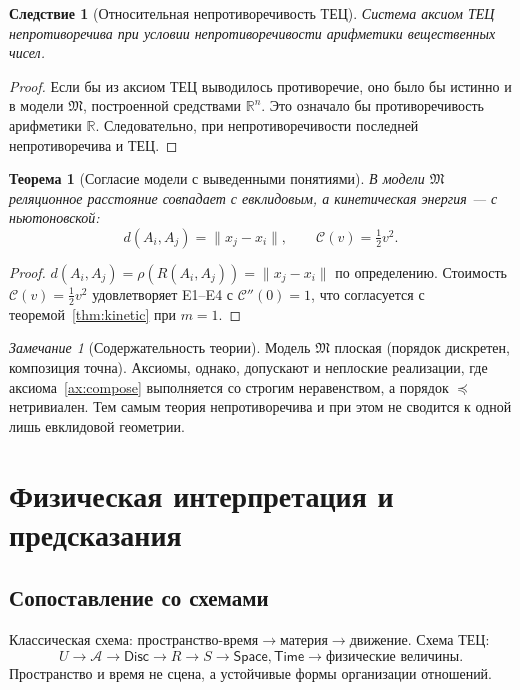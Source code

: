 \documentclass[12pt,a4paper,oneside]{book}
\theoremstyle{definition}
\theoremstyle{plain}
\newtheorem{theorem}{Теорема}[chapter]
\newtheorem{corollary}{Следствие}[chapter]
\theoremstyle{remark}
\newtheorem{remark}{Замечание}[chapter]
\newcommand{\Whole}{U}
\newcommand{\Parts}{\mathcal A}
\newcommand{\Rel}{R}
\newcommand{\State}{S}
\newcommand{\Vord}{\preceq}
\newcommand{\norm}{\rho}
\newcommand{\Disc}{\mathsf{Disc}}
\newcommand{\Space}{\mathsf{Space}}
\newcommand{\Time}{\mathsf{Time}}
\newcommand{\Cost}{\mathcal C}
\begin{document}
\begin{corollary}[Относительная непротиворечивость ТЕЦ]
Система аксиом ТЕЦ непротиворечива при условии непротиворечивости арифметики
вещественных чисел.
\end{corollary}

\begin{proof}
Если бы из аксиом ТЕЦ выводилось противоречие, оно было бы истинно и в модели
$\mathfrak M$, построенной средствами $\mathbb R^n$. Это означало бы противоречивость
арифметики $\mathbb R$. Следовательно, при непротиворечивости последней непротиворечива
и ТЕЦ.
\end{proof}

\begin{theorem}[Согласие модели с выведенными понятиями]
В модели $\mathfrak M$ реляционное расстояние совпадает с евклидовым, а кинетическая
энергия --- с ньютоновской:
\[
d(A_i,A_j)=\|x_j-x_i\|,\qquad \Cost(v)=\tfrac12 v^2.
\]
\end{theorem}

\begin{proof}
$d(A_i,A_j)=\norm(\Rel(A_i,A_j))=\|x_j-x_i\|$ по определению. Стоимость
$\Cost(v)=\tfrac12 v^2$ удовлетворяет E1--E4 с $\Cost''(0)=1$, что согласуется с
теоремой~\ref{thm:kinetic} при $m=1$.
\end{proof}

\begin{remark}[Содержательность теории]
Модель $\mathfrak M$ плоская (порядок дискретен, композиция точна). Аксиомы, однако,
допускают и неплоские реализации, где аксиома~\ref{ax:compose} выполняется со строгим
неравенством, а порядок $\Vord$ нетривиален. Тем самым теория непротиворечива и при
этом не сводится к одной лишь евклидовой геометрии.
\end{remark}

\chapter{Физическая интерпретация и предсказания}

\section{Сопоставление со схемами}

Классическая схема: $\text{пространство-время}\to\text{материя}\to\text{движение}$.
Схема ТЕЦ:
\[
\Whole\to\Parts\to\Disc\to\Rel\to\State\to\Space,\Time\to\text{физические величины}.
\]
Пространство и время не сцена, а устойчивые формы организации отношений.
\end{document}
